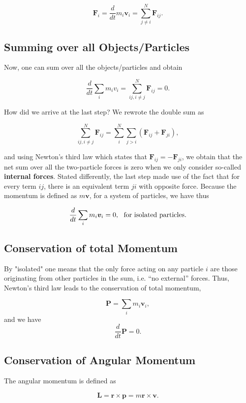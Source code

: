 \documentclass[%
oneside,                 %
final,                   %
10pt]{article}
\begin{document}
\begin{equation}
\bm{F}_i=\frac{d}{dt}m_i\bm{v}_i=\sum_{j\ne i}^N\bm{F}_{ij}.
\end{equation}

\subsection{Summing over all Objects/Particles}

Now, one can sum over all the objects/particles and obtain

\[
\frac{d}{dt}\sum_i m_iv_i=\sum_{ij, i\ne j}^N\bm{F}_{ij}=0.
\]

How did we arrive at the last step?  We rewrote the double sum as

\[
\sum_{ij, i\ne j}^N\bm{F}_{ij}=\sum_i^N\sum_{j>i}\left(\bm{F}_{ij}+\bm{F}_{ji}\right),
\]

and using Newton's third law which states that
$\bm{F}_{ij}=-\bm{F}_{ji}$, we obtain that the net sum over all  the two-particle
forces is zero when we only consider so-called \textbf{internal forces}.
Stated differently, the last step made use of the fact that for every
term $ij$, there is an equivalent term $ji$ with opposite
force. Because the momentum is defined as $m\bm{v}$, for a system of
particles, we have thus

\begin{equation}
\frac{d}{dt}\sum_im_i\bm{v}_i=0,~~{\rm for~isolated~particles}.
\end{equation}

\subsection{Conservation of total Momentum}

By "isolated" one means that the only force acting on any particle $i$
are those originating from other particles in the sum, i.e. ``no
external'' forces. Thus, Newton's third law leads to the conservation
of total momentum,

\[
\bm{P}=\sum_i m_i\bm{v}_i,
\]
and we have
\[
\frac{d}{dt}\bm{P}=0.
\]

\subsection{Conservation of Angular Momentum}

The angular momentum is defined as

\begin{equation}
\bm{L}=\bm{r}\times\bm{p}=m\bm{r}\times\bm{v}.
\end{equation}
\end{document}
